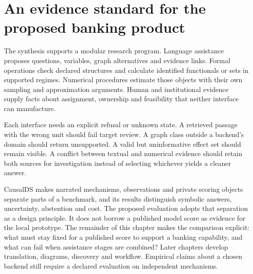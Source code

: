 \section{An evidence standard for the proposed banking product}

The synthesis supports a modular research program. Language assistance proposes
questions, variables, graph alternatives and evidence links. Formal operations
check declared structures and calculate identified functionals or sets in
supported regimes. Numerical procedures estimate those objects with their own
sampling and approximation arguments. Human and institutional evidence supply
facts about assignment, ownership and feasibility that neither interface can
manufacture.

Each interface needs an explicit refusal or unknown state. A retrieved passage
with the wrong unit should fail target review. A graph class outside a backend's
domain should return unsupported. A valid but uninformative effect set should
remain visible. A conflict between textual and numerical evidence should retain
both sources for investigation instead of selecting whichever yields a cleaner
answer.

CausalDS makes narrated mechanisms, observations and private scoring objects
separate parts of a benchmark, and its results distinguish symbolic answers,
uncertainty, abstention and cost. \cite{v12_la_2607_08093} The proposed evaluation
adopts that separation as a design principle. It does not borrow a published
model score as evidence for the local prototype. The remainder of this chapter
makes the comparison explicit: what must stay fixed for a published score to
support a banking capability, and what can fail when assistance stages are
combined? Later chapters develop translation, diagrams, discovery and workflow.
Empirical claims about a chosen backend still require a declared evaluation
on independent mechanisms.
